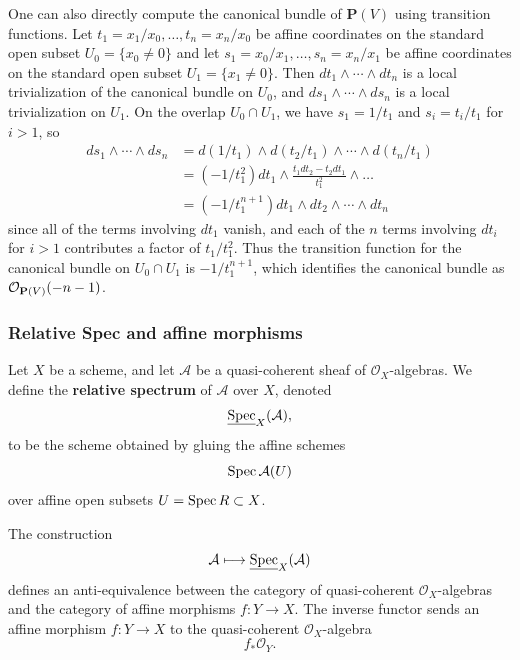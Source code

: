\documentclass[12pt]{article}
\begin{document}
\begin{example}
    One can also directly compute the canonical bundle of $\mathbf P(V)$ using transition functions. Let $t_1 = x_1/x_0, \dots, t_n = x_n/x_0$ be affine coordinates on the standard open subset $U_0 = \{x_0 \neq 0\}$ and let $s_1 = x_0/x_1, \dots, s_n = x_n/x_1$ be affine coordinates on the standard open subset $U_1 = \{x_1 \neq 0\}$. Then $dt_1 \wedge \cdots \wedge dt_n$ is a local trivialization of the canonical bundle on $U_0$, and $ds_1 \wedge \cdots \wedge ds_n$ is a local trivialization on $U_1$. On the overlap $U_0 \cap U_1$, we have $s_1 = 1/t_1$ and $s_i = t_i/t_1$ for $i > 1$, so \begin{align*}
        ds_1 \wedge \cdots \wedge ds_n & = d(1/t_1) \wedge d(t_2/t_1) \wedge \cdots \wedge d(t_n/t_1)        \\
                                       & = (-1/t_1^2) dt_1 \wedge \frac{t_1dt_2-t_2dt_1}{t_1^2} \wedge \dots \\
                                       & = (-1/t_1^{n+1}) dt_1 \wedge dt_2 \wedge \cdots \wedge dt_n
    \end{align*}
    since all of the terms involving $dt_1$ vanish, and each of the $n$ terms involving $dt_i$ for $i > 1$ contributes a factor of $t_1/t_1^2$. Thus the transition function for the canonical bundle on $U_0 \cap U_1$ is $-1/t_1^{n+1}$, which identifies the canonical bundle as ${\mathcal{O}}_{\mathbf P(V)}(-n-1)$.
\end{example}

\subsubsection{Relative Spec and affine morphisms}

Let \(X\) be a scheme, and let \(\mathcal A\) be a quasi-coherent sheaf of \(\mathcal O_X\)-algebras. We define the \textbf{relative spectrum} of \(\mathcal A\) over \(X\), denoted
\[
    \underline{\operatorname{Spec}}_X(\mathcal A),
\]
to be the scheme obtained by gluing the affine schemes
\[
    \operatorname{Spec} \mathcal A(U)
\]
over affine open subsets \(U=\operatorname{Spec} R\subset X\).

\begin{theorem}
    The construction
    \[
        \mathcal A \longmapsto \underline{\operatorname{Spec}}_X(\mathcal A)
    \]
    defines an anti-equivalence between the category of quasi-coherent \(\mathcal O_X\)-algebras and the category of affine morphisms \(f:Y\to X\). The inverse functor sends an affine morphism \(f:Y\to X\) to the quasi-coherent \(\mathcal O_X\)-algebra
    \[
        f_*\mathcal O_Y.
    \]
\end{theorem}
\end{document}
